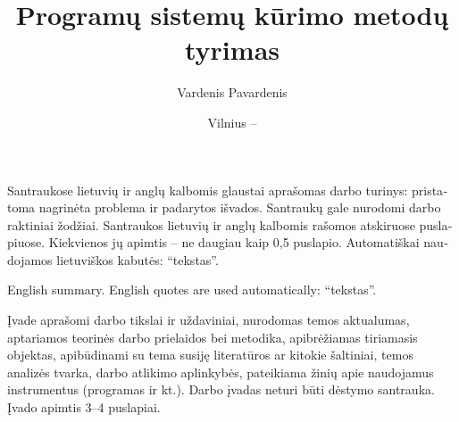 \documentclass[
]{VUMIFSEMasterThesis}
\title{Programų sistemų kūrimo metodų tyrimas}
\author{Vardenis Pavardenis}
\date{Vilnius – \the\year}
\begin{document}
\maketitle


\begin{lithuanian}
Santraukose lietuvių ir anglų kalbomis glaustai aprašomas darbo turinys:
pristatoma nagrinėta problema ir padarytos išvados. Santraukų gale nurodomi
darbo raktiniai žodžiai. Santraukos lietuvių ir anglų kalbomis rašomos
atskiruose puslapiuose. Kiekvienos jų apimtis -- ne daugiau kaip 0,5 puslapio.
Automatiškai naudojamos lietuviškos kabutės: \enquote{tekstas}.

\end{lithuanian}

\begin{english}
English summary. English quotes are used automatically: \enquote{tekstas}.

\end{english}

\tableofcontents

Įvade aprašomi darbo tikslai ir uždaviniai, nurodomas temos aktualumas, aptariamos
teorinės darbo prielaidos bei metodika, apibrėžiamas tiriamasis objektas, apibūdinami
su tema susiję literatūros ar kitokie šaltiniai, temos analizės tvarka, darbo atlikimo
aplinkybės, pateikiama žinių apie naudojamus instrumentus (programas ir kt.). Darbo
įvadas neturi būti dėstymo santrauka. Įvado apimtis 3--4 puslapiai.
\end{document}
